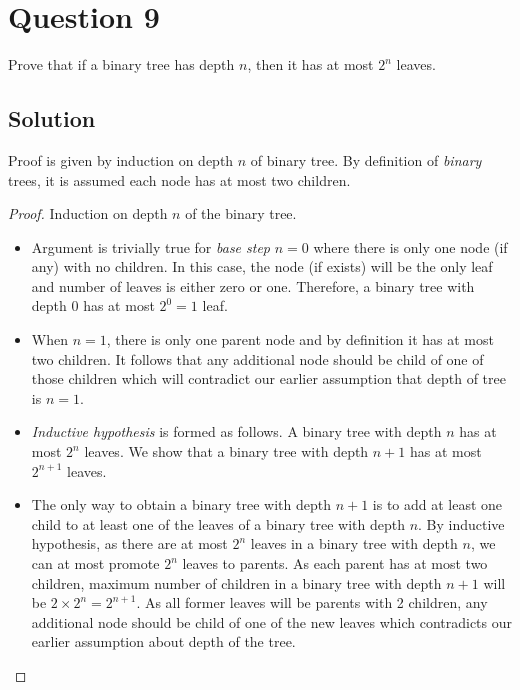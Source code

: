 
\section*{Question 9}

Prove that if a binary tree has depth $n$, then it has at most $2^n$ leaves.

\subsection*{Solution}

Proof is given by induction on depth $n$ of binary tree.
By definition of \textit{binary} trees, it is assumed each node has at most two children.
\begin{proof}
Induction on depth $n$ of the binary tree.
\begin{itemize}
\item[] Argument is trivially true for \emph{base step} $n=0$ where there is only one node (if any) with no children.
In this case, the node (if exists) will be the only leaf and number of leaves is either zero or one.
Therefore, a binary tree with depth $0$ has at most $2^0=1$ leaf.
\item[] When $n=1$, there is only one parent node and by definition it has at most two children.
It follows that any additional node should be child of one of those children which will contradict our earlier assumption that depth of tree is $n=1$.

\item[] \emph{Inductive hypothesis} is formed as follows.
A binary tree with depth $n$ has at most $2^n$ leaves.
We show that a binary tree with depth $n+1$ has at most $2^{n+1}$ leaves.


\item[] The only way to obtain a binary tree with depth $n+1$ is to add at least one child to at least one of the leaves of a binary tree with depth $n$.
By inductive hypothesis, as there are at most $2^n$ leaves in a binary tree with depth $n$, we can at most promote $2^n$ leaves to parents.
As each parent has at most two children, maximum number of children in a binary tree with depth $n+1$ will be $2 \times 2^n = 2^{n+1}$.
As all former leaves will be parents with 2 children, any additional node should be child of one of the new leaves which contradicts our earlier assumption about depth of the tree.

\end{itemize}
\end{proof}
